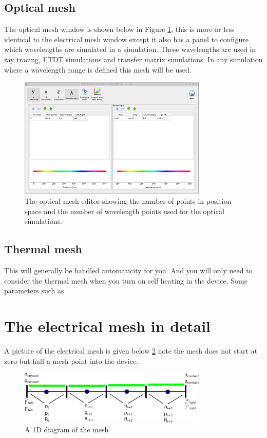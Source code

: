 \subsection{Optical mesh}
The optical mesh window is shown below in Figure \ref{fig:optical_mesh}, this is more or less identical to the electrical mesh window except it also has a panel to configure which wavelengths are simulated in a simulation. These wavelengths are used in ray tracing, FTDT simulations and transfer matrix simulations. In any simulation where a wavelength range is defined this mesh will be used.

\begin{figure}[H]
\centering
\includegraphics[width=0.8\textwidth]{./images/mesh/optical_mesh_window.png}
\caption{The optical mesh editor showing the number of points in position space and the number of wavelength points used for the optical simulations.}
\label{fig:optical_mesh}
\end{figure}

\subsection{Thermal mesh}
This will generally be handled automaticity for you. And you will only need to consider the thermal mesh when you turn on self heating in the device. Some parameters such as 
 
\section{The electrical mesh in detail}
A picture of the electrical mesh is given below \ref{fig:electrical_mesh_diagram} note the mesh does not start at zero but half a mesh point into the device.

\begin{figure}[H]
\centering
\includegraphics[width=0.8\textwidth]{./images/mesh/electrical_mesh_diagram.png}
\caption{A 1D diagram of the mesh}
\label{fig:electrical_mesh_diagram}
\end{figure}

